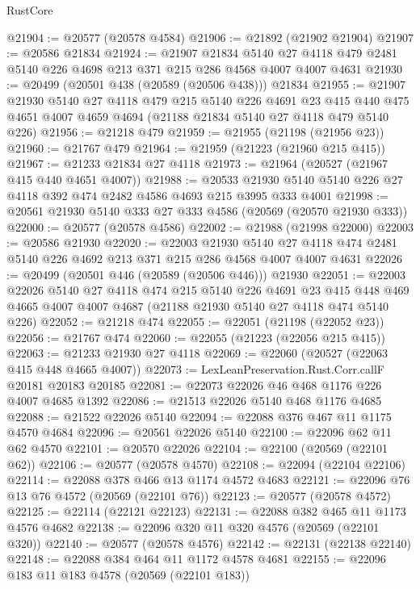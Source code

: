 \begin{lexlean}{RustCore}
\begin{coremodule}
@21904 := @20577 (@20578 @4584)
@21906 := @21892 (@21902 @21904)
@21907 := @20586 @21834
@21924 := @21907
    @21834
    @5140
    @27
    @4118
    @479
    @2481
    @5140
    @226
    @4698
    @213
    @371
    @215
    @286
    @4568
    @4007
    @4007
    @4631
@21930 := @20499 (@20501 @438 (@20589 (@20506 @438))) @21834
@21955 := @21907
    @21930
    @5140
    @27
    @4118
    @479
    @215
    @5140
    @226
    @4691
    @23
    @415
    @440
    @475
    @4651
    @4007
    @4659
    @4694
    (@21188 @21834 @5140 @27 @4118 @479 @5140 @226)
@21956 := @21218 @479
@21959 := @21955 (@21198 (@21956 @23))
@21960 := @21767 @479
@21964 := @21959 (@21223 (@21960 @215 @415))
@21967 := @21233 @21834 @27 @4118
@21973 := @21964 (@20527 (@21967 @415 @440 @4651 @4007))
@21988 := @20533 @21930 @5140 @5140 @226 @27 @4118 @392 @474 @2482 @4586 @4693 @215 @3995 @333 @4001
@21998 := @20561 @21930 @5140 @333 @27 @333 @4586 (@20569 (@20570 @21930 @333))
@22000 := @20577 (@20578 @4586)
@22002 := @21988 (@21998 @22000)
@22003 := @20586 @21930
@22020 := @22003
    @21930
    @5140
    @27
    @4118
    @474
    @2481
    @5140
    @226
    @4692
    @213
    @371
    @215
    @286
    @4568
    @4007
    @4007
    @4631
@22026 := @20499 (@20501 @446 (@20589 (@20506 @446))) @21930
@22051 := @22003
    @22026
    @5140
    @27
    @4118
    @474
    @215
    @5140
    @226
    @4691
    @23
    @415
    @448
    @469
    @4665
    @4007
    @4007
    @4687
    (@21188 @21930 @5140 @27 @4118 @474 @5140 @226)
@22052 := @21218 @474
@22055 := @22051 (@21198 (@22052 @23))
@22056 := @21767 @474
@22060 := @22055 (@21223 (@22056 @215 @415))
@22063 := @21233 @21930 @27 @4118
@22069 := @22060 (@20527 (@22063 @415 @448 @4665 @4007))
@22073 := LexLeanPreservation.Rust.Corr.callF @20181 @20183 @20185
@22081 := @22073 @22026 @46 @468 @1176 @226 @4007 @4685 @1392
@22086 := @21513 @22026 @5140 @468 @1176 @4685
@22088 := @21522 @22026 @5140
@22094 := @22088 @376 @467 @11 @1175 @4570 @4684
@22096 := @20561 @22026 @5140
@22100 := @22096 @62 @11 @62 @4570
@22101 := @20570 @22026
@22104 := @22100 (@20569 (@22101 @62))
@22106 := @20577 (@20578 @4570)
@22108 := @22094 (@22104 @22106)
@22114 := @22088 @378 @466 @13 @1174 @4572 @4683
@22121 := @22096 @76 @13 @76 @4572 (@20569 (@22101 @76))
@22123 := @20577 (@20578 @4572)
@22125 := @22114 (@22121 @22123)
@22131 := @22088 @382 @465 @11 @1173 @4576 @4682
@22138 := @22096 @320 @11 @320 @4576 (@20569 (@22101 @320))
@22140 := @20577 (@20578 @4576)
@22142 := @22131 (@22138 @22140)
@22148 := @22088 @384 @464 @11 @1172 @4578 @4681
@22155 := @22096 @183 @11 @183 @4578 (@20569 (@22101 @183))

\end{coremodule}
\end{lexlean}
